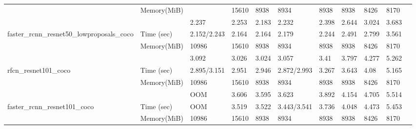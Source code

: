 \documentclass[conference]{IEEEtran}
\begin{document}
\begin{table}[]
{\begin{tabular}{lllllllllll}
                                                                & Memory(MiB)   &                     & 15610              & 8938              & 8934              & 8938             & 8938   & 8426              & 8170        &          \\
                                                                &               & 2.237               & 2.253              & 2.183             & 2.232             & 2.398            & 2.644  & 3.024             & 3.683       &          \\
faster\_rcnn\_resnet50\_lowproposals\_coco                      & Time (sec)    & 2.152/2.243         & 2.164              & 2.164             & 2.179             & 2.244            & 2.491  & 2.799             & 3.561       &          \\
                                                                & Memory(MiB)   & 10986               & 15610              & 8938              & 8934              & 8938             & 8938   & 8426              & 8170        &          \\
                                                                &               & 3.092               & 3.026              & 3.024             & 3.057             & 3.41             & 3.797  & 4.277             & 5.262       &          \\
rfcn\_resnet101\_coco                                           & Time (sec)    & 2.895/3.151         & 2.951              & 2.946             & 2.872/2.993       & 3.267            & 3.643  & 4.08              & 5.165       &          \\
                                                                & Memory(MiB)   & 10986               & 15610              & 8938              & 8934              & 8938             & 8938   & 8426              & 8170        &          \\
                                                                &               & OOM                 & 3.606              & 3.595             & 3.623             & 3.892            & 4.154  & 4.705             & 5.514       &          \\
faster\_rcnn\_resnet101\_coco                                   & Time (sec)    & OOM                 & 3.519              & 3.522             & 3.443/3.541       & 3.736            & 4.048  & 4.473             & 5.453       &          \\
                                                                & Memory(MiB)   & 10986               & 15610              & 8938              & 8934              & 8938             & 8938   & 8426              & 8170        &          \\

\end{tabular}}
\end{table}
\end{document}
